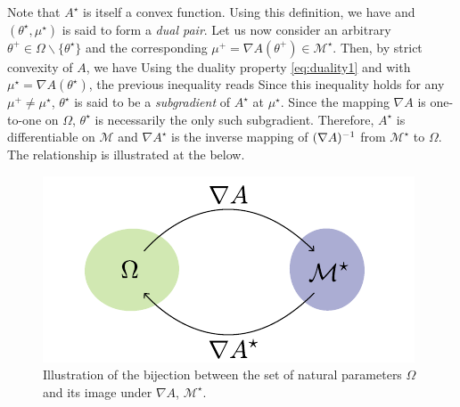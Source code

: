 Note that $A^{\star}$ is itself a convex function. Using this definition, we have
%
%
and $(\theta^{\star},\mu^{\star})$ is said to form a \emph{dual pair}. Let us now consider an arbitrary $\theta^{+}\in\Omega\backslash\{\theta^{\star}\}$ and the corresponding $\mu^{+}=\nabla A(\theta^{+})\in\mathcal M^{\star}$. Then, by strict convexity of $A$, we have
%
%
Using the duality property \eqref{eq:duality1} and with $\mu^{\star}=\nabla A(\theta^{\star})$, the previous inequality reads
%
%
Since this inequality holds for any $\mu^{+}\neq \mu^{\star}$, $\theta^{\star}$ is said to be a \emph{subgradient} of $A^{\star}$ at $\mu^{\star}$. Since the mapping $\nabla A$ is one-to-one on $\Omega$, $\theta^{\star}$ is necessarily the only such subgradient. Therefore, $A^{\star}$ is differentiable on $\mathcal M$ \citep[theorem 25.1]{rockafellar70} and $\nabla A^{\star}$ is the inverse mapping of $(\nabla A)^{-1}$ from $\mathcal M^{\star}$ to $\Omega$. The relationship is illustrated at the  below.

\begin{figure}[!h]
	\center
	\includegraphics{figures/expf/mapping}
	\caption{\label{bijOmM}Illustration of the bijection between the set of natural parameters $\Omega$ and its image under $\nabla A$, $\mathcal M^{\star}$.}
\end{figure}
%
